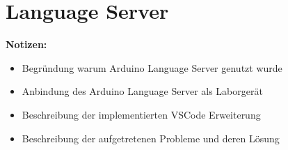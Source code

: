 \section{Language Server}\label{section:prototypische-implementierung:language-server}

\begin{note}
    \textbf{Notizen:}
    \begin{itemize}
        \item Begründung warum Arduino Language Server genutzt wurde
        \item Anbindung des Arduino Language Server als Laborgerät
        \item Beschreibung der implementierten VSCode Erweiterung
        \item Beschreibung der aufgetretenen Probleme und deren Lösung
    \end{itemize}
\end{note}